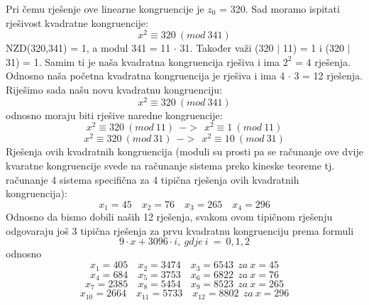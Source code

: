 \documentclass[12pt]{article}
\begin{document}
\begin{enumerate}
		Pri čemu rješenje ove linearne kongruencije je $z_0$ = 320.
		Sad moramo ispitati rješivost kvadratne kongruencije:
		\begin{equation*}
		x^2 \equiv 320~(mod~341)
		\end{equation*}
		NZD(320,341) =  1, a modul 341 = 11 ${\cdot}$ 31. Također važi (320 ${\mid}$ 11) = 1 i 
		(320 ${\mid}$ 31) = 1. Samim ti je naša kvadratna kongruencija rješiva i ima $2^2$ = 4 rješenja.
		Odnosno naša početna kvadratna kongruencija je rješiva i ima 4 ${\cdot}$ 3 = 12 rješenja.
		Riješimo sada našu novu kvadratnu kongruenciju: 
		\begin{equation*}
		x^2 \equiv 320~(mod~341)
		\end{equation*}
		odnosno moraju biti rješive naredne kongruencije:
		\begin{equation*}
		x^2 \equiv 320~(mod~11)~~->~~x^2 \equiv 1~(mod~11)
		\end{equation*}
		\begin{equation*}
		x^2 \equiv 320~(mod~31)~~->~~x^2 \equiv 10~(mod~31)
		\end{equation*}
		Rješenja ovih kvadratnih kongruencija (moduli su prosti pa se računanje ove dvije
		kvaratne kongruencije svede na računanje sistema preko
		kineske teoreme tj. računanje 4 sistema specifična za 4 tipična rješenja ovih kvadratnih
		kongruencija):
		\begin{equation*}
		x_1 = 45 \quad x_2 = 76 \quad x_3 = 265 \quad x_4 = 296
		\end{equation*}
		Odnosno da bismo dobili naših 12 rješenja, svakom ovom tipičnom rješenju odgovaraju još 3 tipična
		rješenja za prvu kvadratnu kongruenciju prema formuli
		\begin{equation*}
		9 \cdot x + 3096 \cdot i,~gdje~i~=~ 0,1,2
		\end{equation*}
		odnosno
		\begin{equation*}
		x_1 = 405 \quad x_2 = 3474 \quad x_3 = 6543 ~~ za~x=45
		\end{equation*}
		\begin{equation*}
		x_4 = 684 \quad x_5 = 3753 \quad x_6 = 6822 ~~ za~x=76
		\end{equation*}
		\begin{equation*}
		x_7 = 2385 \quad x_8 = 5454 \quad x_9 = 8523 ~~ za~x=265
		\end{equation*}
		\begin{equation*}
		x_{10} = 2664 \quad x_{11} = 5733 \quad x_{12} = 8802 ~~ za~x=296
		\end{equation*}
	

\end{enumerate}
\end{document}
